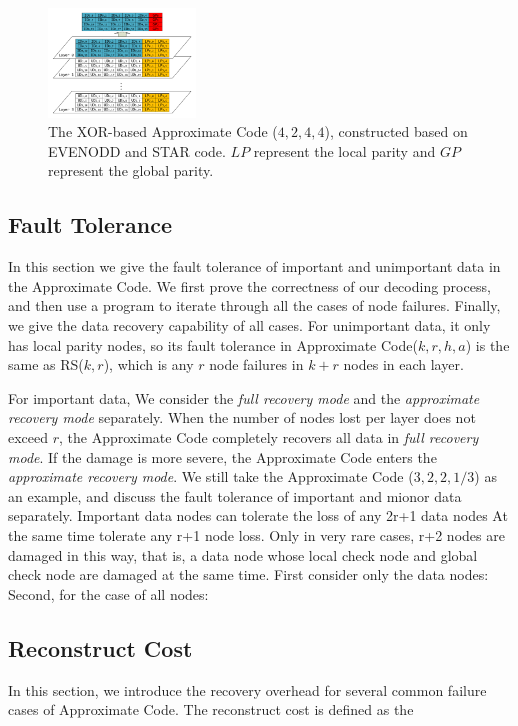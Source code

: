 \documentclass[sigconf]{acmart}
\begin{document}
\begin{figure}[h]
\centering
\includegraphics[width=0.35\textwidth]{photo/AP-EVEN-star-v2.pdf}
\caption{The XOR-based Approximate Code ($4,2,4,4$), constructed based on EVENODD and STAR code. $LP$ represent the local parity and $GP$ represent the global parity.}
\label{fig-ap-STAR}
\end{figure}

\iffalse
\subsection{Fault Tolerance}
In this section we give the fault tolerance of important and unimportant data in the Approximate Code.
We first prove the correctness of our decoding process, and then use a program to 
iterate through all the cases of node failures. Finally, we give the data recovery capability of all cases.
For unimportant data, it only has local parity nodes, so its fault tolerance in Approximate Code($k,r,h,a$) is the same as RS($k,r$), which is any $r$ node failures in $k+r$ nodes in each layer.

For important data, We consider the \emph{full recovery mode} and the \emph{approximate recovery mode} separately. When the number of nodes lost per layer does not exceed $r$, the Approximate Code completely recovers all data in \emph{full recovery mode}. If the damage is more severe, the Approximate Code enters the \emph{approximate recovery mode}.
We still take the Approximate Code ($3, 2, 2, 1/3$) as an example, and discuss the fault tolerance of important and mionor data separately.
Important data nodes can tolerate the loss of any 2r+1 data nodes
At the same time tolerate any r+1 node loss. Only in very rare cases, r+2 nodes are damaged in this way, that is, a data node whose local check node and global check node are damaged at the same time.
First consider only the data nodes:
Second, for the case of all nodes:
\subsection{Reconstruct Cost}
In this section, we introduce the recovery overhead for several common failure cases of Approximate Code. The reconstruct cost is defined as the 
\end{document}
